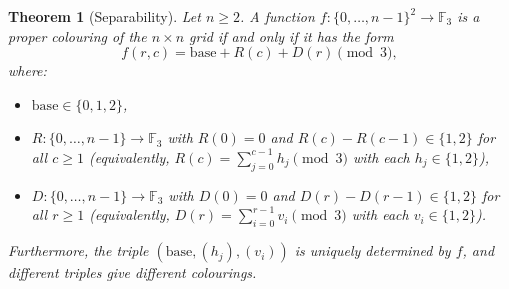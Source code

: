 \documentclass{article}
\newtheorem{theorem}{Theorem}[section]
\begin{document}
\begin{theorem}[Separability]
\label{thm:sep}
Let $n\geq 2$.  A function $f:\{0,\ldots,n-1\}^2\to\mathbb{F}_3$
is a proper colouring of the $n\times n$ grid if and only if
it has the form
\begin{equation}
  f(r,c) = \mathrm{base} + R(c) + D(r) \pmod3,
  \label{eq:sep}
\end{equation}
where:
\begin{itemize}
  \item $\mathrm{base}\in\{0,1,2\}$,
  \item $R:\{0,\ldots,n-1\}\to\mathbb{F}_3$ with $R(0)=0$ and
    $R(c) - R(c-1)\in\{1,2\}$ for all $c\geq 1$
    (equivalently, $R(c) = \sum_{j=0}^{c-1}h_j\pmod3$ with
    each $h_j\in\{1,2\}$),
  \item $D:\{0,\ldots,n-1\}\to\mathbb{F}_3$ with $D(0)=0$ and
    $D(r) - D(r-1)\in\{1,2\}$ for all $r\geq 1$
    (equivalently, $D(r) = \sum_{i=0}^{r-1}v_i\pmod3$ with
    each $v_i\in\{1,2\}$).
\end{itemize}
Furthermore, the triple $(\mathrm{base},(h_j),(v_i))$ is
uniquely determined by $f$, and different triples give
different colourings.
\end{theorem}
\end{document}
